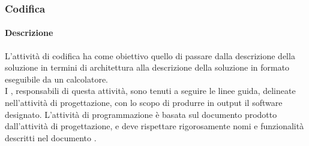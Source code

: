 \documentclass[../NormeDiProgetto_v4.0.0.tex]{subfiles}
\begin{document}
		\subsubsection{Codifica}
			\paragraph{Descrizione}
        	L'attività di codifica ha come obiettivo quello di passare dalla descrizione della soluzione in termini di architettura alla descrizione della soluzione in formato eseguibile da un calcolatore. \\ 
			I \programmatori, responsabili di questa attività, sono tenuti a seguire le linee guida, delineate nell'attività di progettazione, con lo scopo di produrre in output il software designato.
			L'attività di programmazione è basata sul documento prodotto dall'attività di progettazione, e deve rispettare rigorosamente nomi e funzionalità descritti nel documento .
\end{document}
